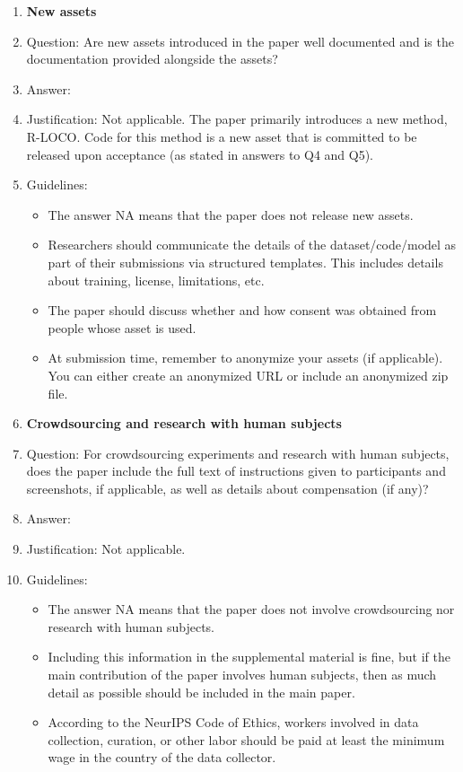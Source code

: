 \documentclass{article}
\theoremstyle{plain}
\theoremstyle{definition}
\theoremstyle{remark}
\begin{document}
\begin{enumerate}
\item {\bf New assets}
    \item[] Question: Are new assets introduced in the paper well documented and is the documentation provided alongside the assets?
    \item[] Answer: \answerNA{} %
    \item[] Justification: Not applicable. The paper primarily introduces a new method, R-LOCO. Code for this method is a new asset that is committed to be released upon acceptance (as stated in answers to Q4 and Q5). 
    \item[] Guidelines:
    \begin{itemize}
        \item The answer NA means that the paper does not release new assets.
        \item Researchers should communicate the details of the dataset/code/model as part of their submissions via structured templates. This includes details about training, license, limitations, etc. 
        \item The paper should discuss whether and how consent was obtained from people whose asset is used.
        \item At submission time, remember to anonymize your assets (if applicable). You can either create an anonymized URL or include an anonymized zip file.
    \end{itemize}

\item {\bf Crowdsourcing and research with human subjects}
    \item[] Question: For crowdsourcing experiments and research with human subjects, does the paper include the full text of instructions given to participants and screenshots, if applicable, as well as details about compensation (if any)? 
    \item[] Answer: \answerNA{} %
    \item[] Justification: Not applicable.
    \item[] Guidelines:
    \begin{itemize}
        \item The answer NA means that the paper does not involve crowdsourcing nor research with human subjects.
        \item Including this information in the supplemental material is fine, but if the main contribution of the paper involves human subjects, then as much detail as possible should be included in the main paper. 
        \item According to the NeurIPS Code of Ethics, workers involved in data collection, curation, or other labor should be paid at least the minimum wage in the country of the data collector. 
    \end{itemize}


\end{enumerate}
\end{document}
